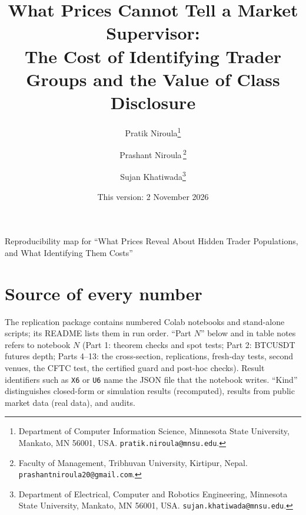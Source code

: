 \documentclass[12pt]{article}
\title{What Prices Cannot Tell a Market Supervisor:\\ The Cost of Identifying Trader Groups and the Value of Class Disclosure}
\author{Pratik Niroula\thanks{Department of Computer Information Science, Minnesota State University, Mankato, MN 56001, USA. \texttt{pratik.niroula@mnsu.edu}.}
\and Prashant Niroula\,\thanks{Faculty of Management, Tribhuvan University, Kirtipur, Nepal. \texttt{prashantniroula20@gmail.com}.}
\and Sujan Khatiwada\thanks{Department of Electrical, Computer and Robotics Engineering, Minnesota State University, Mankato, MN 56001, USA. \texttt{sujan.khatiwada@mnsu.edu}.}}
\date{This version: 2 November 2026}
\theoremstyle{definition}
\theoremstyle{remark}
\begin{document}
\begin{center}\large Reproducibility map for ``What Prices Reveal About Hidden Trader Populations, and What Identifying Them Costs''\end{center}
\section*{Source of every number}

The replication package contains numbered Colab notebooks and stand-alone scripts; its README lists them in run order. ``Part $N$'' below and in table notes refers to notebook $N$ (Part 1: theorem checks and spot tests; Part 2: BTCUSDT futures depth; Parts 4--13: the cross-section, replications, fresh-day tests, second venues, the CFTC test, the certified guard and post-hoc checks). Result identifiers such as \texttt{X6} or \texttt{U6} name the JSON file that the notebook writes. ``Kind'' distinguishes closed-form or simulation results (recomputed), results from public market data (real data), and audits.
\end{document}
